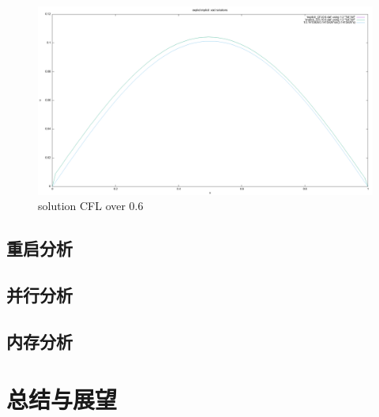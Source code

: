 \documentclass[final]{cvpr}
\begin{document}
\begin{figure}[htbp]
	\centering
	\includegraphics[scale=0.15]{./figures/solution_CFL_over05.png}
	\caption{solution CFL over 0.6}
	\label{figure}
\end{figure}

\subsection{重启分析}

\subsection{并行分析}

\subsection{内存分析}




\section{总结与展望}\label{sec:Conclusion}
\end{document}
